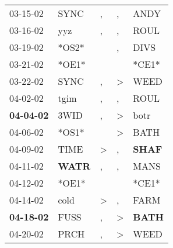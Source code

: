 \begin{supertabular}{p{0.07\textwidth}p{0.06\textwidth}p{0.02\textwidth}p{0.02\textwidth}p{0.06\textwidth}}
          03-15-02\textsuperscript{} &           SYNC\textsuperscript{} &                , &                , &           ANDY\textsuperscript{} \\
          03-16-02\textsuperscript{} &            yyz\textsuperscript{} &                , &                , &           ROUL\textsuperscript{} \\
          03-19-02\textsuperscript{} &                            *OS2* &                  &                , &           DIVS\textsuperscript{} \\
          03-21-02\textsuperscript{} &                            *OE1* &                  &                  &                            *CE1* \\
          03-22-02\textsuperscript{} &           SYNC\textsuperscript{} &                , &     \textgreater &           WEED\textsuperscript{} \\
          04-02-02\textsuperscript{} &           tgim\textsuperscript{} &                , &                , &           ROUL\textsuperscript{} \\
 \textbf{04-04-02\textsuperscript{}} &           3WID\textsuperscript{} &                , &     \textgreater &           botr\textsuperscript{} \\
          04-06-02\textsuperscript{} &                            *OS1* &                  &     \textgreater &           BATH\textsuperscript{} \\
          04-09-02\textsuperscript{} &           TIME\textsuperscript{} &     \textgreater &                , &  \textbf{SHAF\textsuperscript{}} \\
          04-11-02\textsuperscript{} &  \textbf{WATR\textsuperscript{}} &                , &                , &           MANS\textsuperscript{} \\
          04-12-02\textsuperscript{} &                            *OE1* &                  &                  &                            *CE1* \\
          04-14-02\textsuperscript{} &           cold\textsuperscript{} &     \textgreater &                , &           FARM\textsuperscript{} \\
 \textbf{04-18-02\textsuperscript{}} &           FUSS\textsuperscript{} &                , &     \textgreater &  \textbf{BATH\textsuperscript{}} \\
          04-20-02\textsuperscript{} &           PRCH\textsuperscript{} &                , &     \textgreater &           WEED\textsuperscript{} \\

\end{supertabular}
